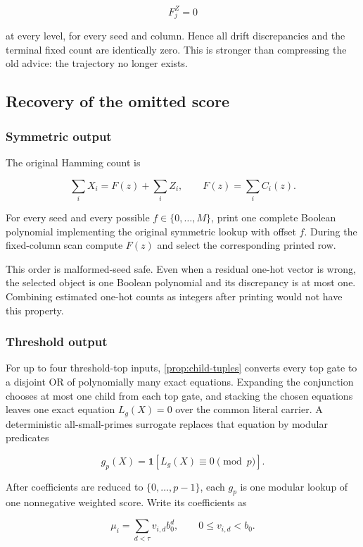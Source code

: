 \documentclass[11pt,letterpaper]{article}
\newcommand{\cref}[1]{\ref{#1}}
\theoremstyle{definition}
\theoremstyle{remark}
\begin{document}
\[
F_j^Z=0
\]

at every level, for every seed and column. Hence all drift discrepancies
and the terminal fixed count are identically zero. This is stronger than
compressing the old advice: the trajectory no longer exists.

\subsection{Recovery of the omitted
score}\label{a3-recovery-of-the-omitted-score}

\subsubsection{Symmetric output}\label{a31-symmetric-output}

The original Hamming count is

\[
\sum_iX_i=F(z)+\sum_iZ_i,
\qquad
F(z)=\sum_iC_i(z).
\]

For every seed and every possible \(f\in\{0,\ldots,M\}\), print one
complete Boolean polynomial implementing the original symmetric lookup
with offset \(f\). During the fixed-column scan compute \(F(z)\) and
select the corresponding printed row.

This order is malformed-seed safe. Even when a residual one-hot vector
is wrong, the selected object is one Boolean polynomial and its
discrepancy is at most one. Combining estimated one-hot counts as
integers after printing would not have this property.

\subsubsection{Threshold output}\label{a32-threshold-output}

For up to four threshold-top inputs, \cref{prop:child-tuples} converts every
top gate to a disjoint OR of polynomially many exact equations.
Expanding the conjunction chooses at most one child from each top gate,
and stacking the chosen equations leaves one exact equation \(L_g(X)=0\)
over the common literal carrier. A deterministic all-small-primes
surrogate replaces that equation by modular predicates

\[
g_p(X)=\mathbf1[L_g(X)\equiv0\pmod p].
\]

After coefficients are reduced to \(\{0,\ldots,p-1\}\), each \(g_p\) is
one modular lookup of one nonnegative weighted score. Write its
coefficients as

\[
\mu_i=\sum_{d<\tau}v_{i,d}b_0^d,
\qquad
0\le v_{i,d}<b_0.
\]
\end{document}
